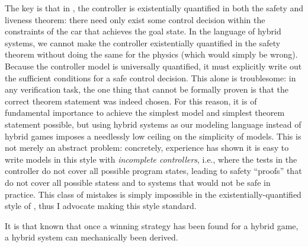 The key is that in , the controller is existentially quantified in both the safety and liveness theorem: there need only exist some control decision within the constraints of the car that achieves the goal state.
In the language of hybrid systems, we cannot make the controller existentially quantified in the safety theorem without doing the same for the physics (which would simply be wrong).
Because the controller model is universally quantified, it must explicitly write out the sufficient conditions for a safe control decision.
This alone is troublesome: in any verification task, the one thing that cannot be formally proven is that the correct theorem statement was indeed chosen.
For this reason, it is of fundamental importance to achieve the simplest model and simplest theorem statement possible, but using hybrid systems as our modeling language instead of hybrid games imposes a needlessly low ceiling on the simplicity of models.
This is not merely an abstract problem: concretely, experience has shown it is easy to write models in this style with \emph{incomplete controllers}, i.e., where the tests in the controller do not cover all possible program states, leading to safety ``proofs'' that do not cover all possible statess and to systems that would not be safe in practice.
This class of mistakes is simply impossible in the existentially-quantified style of , thus I advocate making this style standard.


It is that known that once a winning strategy has been found for a hybrid game, a hybrid system can mechanically been derived.
